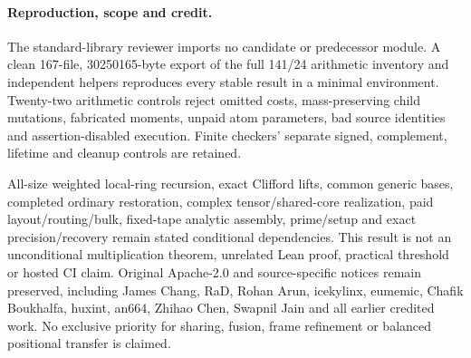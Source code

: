 \documentclass[11pt]{article}
\begin{document}
\paragraph{Reproduction, scope and credit.}
The standard-library reviewer imports no candidate or predecessor module.
A clean 167-file, 30250165-byte export of the full 141/24 arithmetic
inventory and independent helpers reproduces every stable result in a
minimal environment. Twenty-two arithmetic controls reject omitted costs,
mass-preserving child mutations, fabricated moments, unpaid atom parameters,
bad source identities and assertion-disabled execution. Finite checkers'
separate signed, complement, lifetime and cleanup controls are retained.

All-size weighted local-ring recursion, exact Clifford lifts, common
generic bases, completed ordinary restoration, complex tensor/shared-core
realization, paid layout/routing/bulk, fixed-tape analytic assembly,
prime/setup and exact precision/recovery remain stated conditional
dependencies. This result is not an unconditional multiplication theorem,
unrelated Lean proof, practical threshold or hosted CI claim.
Original Apache-2.0 and source-specific notices remain preserved, including
James Chang, RaD, Rohan Arun, icekylinx, eumemic, Chafik Boukhalfa,
huxint, an664, Zhihao Chen, Swapnil Jain and all earlier credited work.
No exclusive priority for sharing, fusion, frame refinement or balanced
positional transfer is claimed.
\end{document}
